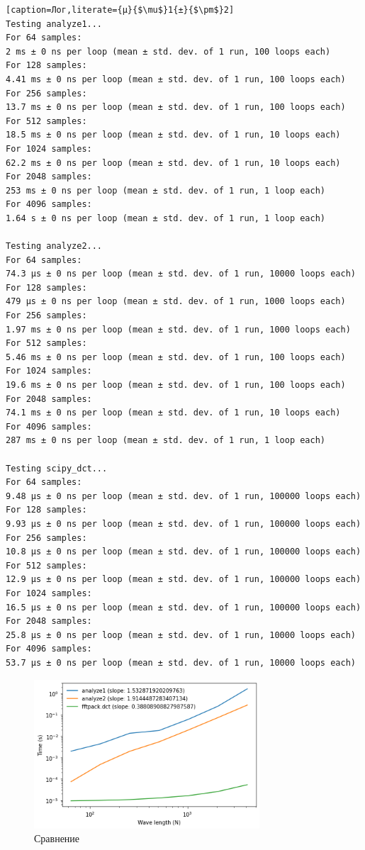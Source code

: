 \documentclass[a4paper,12pt]{report}
\begin{document}
\begin{lstlisting}[caption=Лог,literate={µ}{$\mu$}1{±}{$\pm$}2]
Testing analyze1...
For 64 samples:
2 ms ± 0 ns per loop (mean ± std. dev. of 1 run, 100 loops each)
For 128 samples:
4.41 ms ± 0 ns per loop (mean ± std. dev. of 1 run, 100 loops each)
For 256 samples:
13.7 ms ± 0 ns per loop (mean ± std. dev. of 1 run, 100 loops each)
For 512 samples:
18.5 ms ± 0 ns per loop (mean ± std. dev. of 1 run, 10 loops each)
For 1024 samples:
62.2 ms ± 0 ns per loop (mean ± std. dev. of 1 run, 10 loops each)
For 2048 samples:
253 ms ± 0 ns per loop (mean ± std. dev. of 1 run, 1 loop each)
For 4096 samples:
1.64 s ± 0 ns per loop (mean ± std. dev. of 1 run, 1 loop each)

Testing analyze2...
For 64 samples:
74.3 µs ± 0 ns per loop (mean ± std. dev. of 1 run, 10000 loops each)
For 128 samples:
479 µs ± 0 ns per loop (mean ± std. dev. of 1 run, 1000 loops each)
For 256 samples:
1.97 ms ± 0 ns per loop (mean ± std. dev. of 1 run, 1000 loops each)
For 512 samples:
5.46 ms ± 0 ns per loop (mean ± std. dev. of 1 run, 100 loops each)
For 1024 samples:
19.6 ms ± 0 ns per loop (mean ± std. dev. of 1 run, 100 loops each)
For 2048 samples:
74.1 ms ± 0 ns per loop (mean ± std. dev. of 1 run, 10 loops each)
For 4096 samples:
287 ms ± 0 ns per loop (mean ± std. dev. of 1 run, 1 loop each)

Testing scipy_dct...
For 64 samples:
9.48 µs ± 0 ns per loop (mean ± std. dev. of 1 run, 100000 loops each)
For 128 samples:
9.93 µs ± 0 ns per loop (mean ± std. dev. of 1 run, 100000 loops each)
For 256 samples:
10.8 µs ± 0 ns per loop (mean ± std. dev. of 1 run, 100000 loops each)
For 512 samples:
12.9 µs ± 0 ns per loop (mean ± std. dev. of 1 run, 100000 loops each)
For 1024 samples:
16.5 µs ± 0 ns per loop (mean ± std. dev. of 1 run, 100000 loops each)
For 2048 samples:
25.8 µs ± 0 ns per loop (mean ± std. dev. of 1 run, 10000 loops each)
For 4096 samples:
53.7 µs ± 0 ns per loop (mean ± std. dev. of 1 run, 10000 loops each)
\end{lstlisting}

    \begin{figure}[H]
        \centering
        \includegraphics[width=0.75\textwidth]{images/ex1_all.png}
        \caption{Сравнение}
        \label{fig:ex1_all}
    \end{figure}
    
\end{document}
